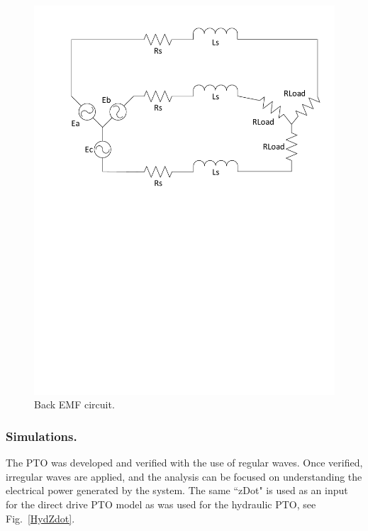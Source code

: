 \documentclass[twocolumn,10pt]{asme2e}
\begin{document}
\begin{figure}[t]
    \centering
    \includegraphics[width=1\columnwidth]{Images/BackEMFCkt}
    \caption{Back EMF circuit.}
    \label{EMF}
    \end{figure}

\subsubsection*{Simulations.}
 
The PTO was developed and verified with the use of regular waves. Once verified, irregular waves are applied, and the analysis can be focused on understanding the electrical power generated by the system. The same ``zDot" is used as an input for the direct drive PTO model as was used for the hydraulic PTO, see Fig.~\ref{HydZdot}. 


\end{document}
